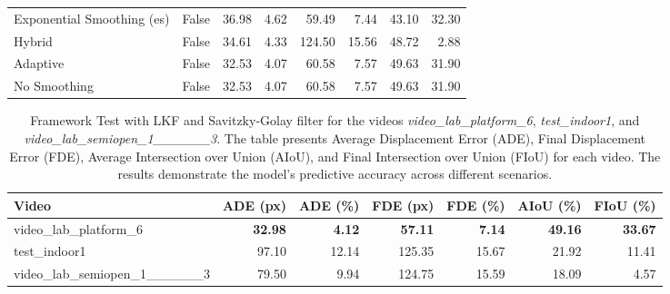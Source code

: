 \documentclass[12pt,oneside]{book} %
\begin{document}
\begin{table}[H]
\begin{adjustbox}{max width=\textwidth}
\begin{tabular}{llrrrrrr}
            Exponential Smoothing (es)   & False         & 36.98             & 4.62              & 59.49             & 7.44              & 43.10              & 32.30              \\
            Hybrid                       & False         & 34.61             & 4.33              & 124.50            & 15.56             & 48.72              & 2.88               \\
            Adaptive                     & False         & 32.53             & 4.07              & 60.58             & 7.57              & 49.63              & 31.90              \\
            No Smoothing                 & False         & 32.53             & 4.07              & 60.58             & 7.57              & 49.63              & 31.90              \\
            \bottomrule
        \end{tabular}
    \end{adjustbox}
    \label{tab:performance_metrics}
\end{table}

\begin{table}[H]
    \centering
    \caption{Framework Test with LKF and Savitzky-Golay filter for the videos \textit{video\_lab\_platform\_6}, \textit{test\_indoor1}, and \textit{video\_lab\_semiopen\_1\_\_\_\_\_\_3}. The table presents Average Displacement Error (ADE), Final Displacement Error (FDE), Average Intersection over Union (AIoU), and Final Intersection over Union (FIoU) for each video. The results demonstrate the model’s predictive accuracy across different scenarios.}
    \begin{adjustbox}{max width=\textwidth}
        \begin{tabular}{lrrrrrr}
            \toprule
            \textbf{Video}                       & \textbf{ADE (px)} & \textbf{ADE (\%)} & \textbf{FDE (px)} & \textbf{FDE (\%)} & \textbf{AIoU (\%)} & \textbf{FIoU (\%)} \\
            \midrule
            video\_lab\_platform\_6              & \textbf{32.98}    & \textbf{4.12}     & \textbf{57.11}    & \textbf{7.14}     & \textbf{49.16}     & \textbf{33.67}     \\
            test\_indoor1                        & 97.10             & 12.14             & 125.35            & 15.67             & 21.92              & 11.41              \\
            video\_lab\_semiopen\_1\_\_\_\_\_\_3 & 79.50             & 9.94              & 124.75            & 15.59             & 18.09              & 4.57               \\
            \bottomrule
        \end{tabular}
    \end{adjustbox}
    \label{tab:framework-test}
\end{table}
\end{document}
